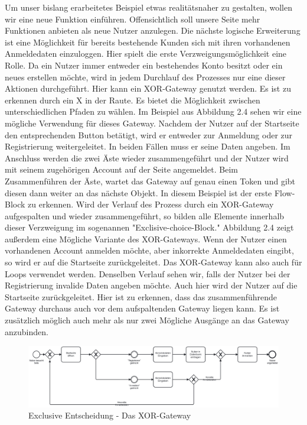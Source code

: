 Um unser bislang erarbeitetes Beispiel etwas realitätsnaher zu gestalten, wollen wir eine neue Funktion einführen. Offensichtlich soll unsere Seite mehr Funktionen anbieten als neue Nutzer anzulegen. Die nächste logische Erweiterung ist eine Möglichkeit für bereits bestehende Kunden sich mit ihren vorhandenen Anmeldedaten einzuloggen. Hier spielt die erste Verzweigungsmöglichkeit eine Rolle. Da ein Nutzer immer entweder ein bestehendes Konto besitzt oder ein neues erstellen möchte, wird in jedem Durchlauf des Prozesses nur eine dieser Aktionen durchgeführt. Hier kann ein XOR-Gateway genutzt werden. Es ist zu erkennen durch ein X in der Raute. Es bietet die Möglichkeit zwischen unterschiedlichen Pfaden zu wählen. Im Beispiel aus Abbildung 2.4 sehen wir eine mögliche Verwendung für dieses Gateway. Nachdem der Nutzer auf der Startseite den entsprechenden Button betätigt, wird er entweder zur Anmeldung oder zur Registrierung weitergeleitet. In beiden Fällen muss er seine Daten angeben. Im Anschluss werden die zwei Äste wieder zusammengeführt und der Nutzer wird mit seinem zugehörigen Account auf der Seite angemeldet. Beim Zusammenführen der Äste, wartet das Gateway auf genau einen Token und gibt diesen dann weiter an das nächste Objekt. In diesem Beispiel ist der erste Flow-Block zu erkennen. Wird der Verlauf des Prozess durch ein XOR-Gateway aufgespalten und wieder zusammengeführt, so bilden alle Elemente innerhalb dieser Verzweigung im sogenannen "Exclisive-choice-Block." Abbildung 2.4 zeigt außerdem eine Mögliche Variante des XOR-Gateways. Wenn der Nutzer einen vorhandenen Account anmelden möchte, aber inkorrekte Anmeldedaten eingibt, so wird er auf die Startseite zurückgeleitet. Das XOR-Gateway kann also auch für Loops verwendet werden. Denselben Verlauf sehen wir, falls der Nutzer bei der Registrierung invalide Daten angeben möchte. Auch hier wird der Nutzer auf die Startseite zurückgeleitet. Hier ist zu erkennen, dass das zusammenführende Gateway durchaus auch vor dem aufspaltenden Gateway liegen kann. Es ist zusätzlich möglich auch mehr als nur zwei Mögliche Ausgänge an das Gateway anzubinden. 



\begin{figure}
\centering
\includegraphics[width=15cm]{Figures/Beispiel5}
\decoRule
\caption[XOR-Gateway]{Exclusive Entscheidung - Das XOR-Gateway}
\label{fig:Task}
\end{figure}


